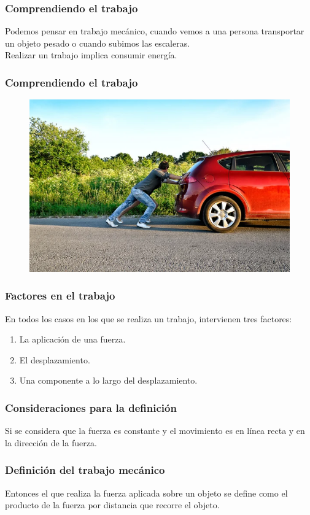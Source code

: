 \documentclass[14pt]{beamer}
\begin{document}
\begin{frame}
\frametitle{Comprendiendo el trabajo}
Podemos pensar en trabajo mecánico, cuando vemos a una persona transportar un objeto pesado o cuando subimos las escaleras.
\\
\bigskip
\pause
Realizar un trabajo implica consumir energía.
\end{frame}
\begin{frame}
\frametitle{Comprendiendo el trabajo}
\begin{figure}
    \centering
    \includegraphics[scale=0.4]{Imagenes/Energia_03.png}
\end{figure}
\end{frame}
\begin{frame}
\frametitle{Factores en el trabajo}
En todos los casos en los que se realiza un trabajo, intervienen tres factores:
\pause
{}
\begin{enumerate}[<+->]
\item La aplicación de una fuerza.
\item El desplazamiento.
\item Una componente a lo largo del desplazamiento.
\end{enumerate}
\end{frame}
\begin{frame}
\frametitle{Consideraciones para la definición}
Si se considera que la fuerza es constante y el movimiento es en línea recta y en la dirección de la fuerza.
\end{frame}
\begin{frame}
\frametitle{Definición del trabajo mecánico}
Entonces el  que realiza la fuerza aplicada sobre un objeto se define como el producto de la fuerza por distancia que recorre el objeto.
\end{frame}
\end{document}
